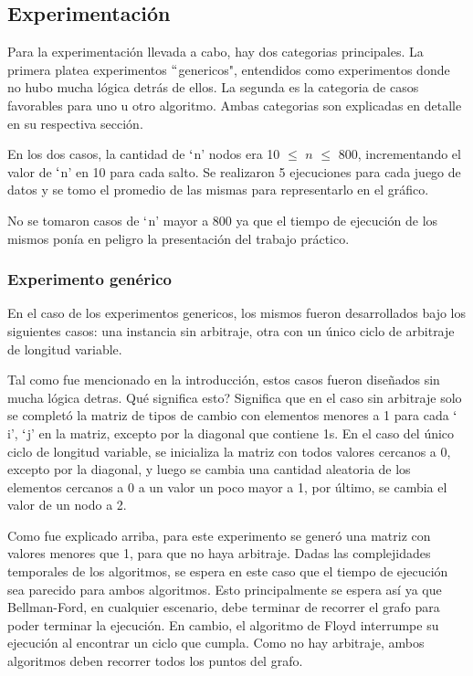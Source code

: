 \subsection{Experimentación}
Para la experimentación llevada a cabo, hay dos categorias principales. La primera platea experimentos $``$genericos", entendidos como experimentos donde no hubo mucha lógica detrás de ellos. La segunda es la categoria de casos favorables para uno u otro algoritmo. Ambas categorias son explicadas en detalle en su respectiva sección.

En los dos casos, la cantidad de $`$n' nodos era 10 $\leq$ $n$ $\leq$ 800, incrementando el valor de $`$n' en 10 para cada salto. Se realizaron 5 ejecuciones para cada juego de datos y se tomo el promedio de las mismas para representarlo en el gráfico.

No se tomaron casos de $`$n' mayor a 800 ya que el tiempo de ejecución de los mismos ponía en peligro la presentación del trabajo práctico.

\subsubsection{Experimento genérico} \label{generico}
En el caso de los experimentos genericos, los mismos fueron desarrollados bajo los siguientes casos: una instancia sin arbitraje, otra con un único ciclo de arbitraje de longitud variable.

Tal como fue mencionado en la introducción, estos casos fueron diseñados sin mucha lógica detras. Qué significa esto? Significa que en el caso sin arbitraje solo se completó la matriz de tipos de cambio con elementos menores a 1 para cada $`$i', $`$j' en la matriz, excepto por la diagonal que contiene 1s. En el caso del único ciclo de longitud variable, se inicializa la matriz con todos valores cercanos a 0, excepto por la diagonal, y luego se cambia una cantidad aleatoria de los elementos cercanos a 0 a un valor un poco mayor a 1, por último, se cambia el valor de un nodo a 2.

 \label{sinArbitraje}
Como fue explicado arriba, para este experimento se generó una matriz con valores menores que 1, para que no haya arbitraje. Dadas las complejidades temporales de los algoritmos, se espera en este caso que el tiempo de ejecución sea parecido para ambos algoritmos. Esto principalmente se espera así ya que Bellman-Ford, en cualquier escenario, debe terminar de recorrer el grafo para poder terminar la ejecución. En cambio, el algoritmo de Floyd interrumpe su ejecución al encontrar un ciclo que cumpla. Como no hay arbitraje, ambos algoritmos deben recorrer todos los puntos del grafo.

